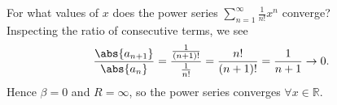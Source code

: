 \documentclass[../real_analysis.tex]{subfiles}
\begin{document}
        \begin{example}
            For what values of $x$ does the power series $\sum_{n=1}^\infty\frac{1}{n!}x^n$ converge?\\
            Inspecting the ratio of consecutive terms, we see
            \begin{equation*}
                \frac{\abs{a_{n+1}}}{\abs{a_n}}=\frac{\frac{1}{(n+1)!}}{\frac{1}{n!}}=\frac{n!}{(n+1)!}=\frac{1}{n+1}\to0.
            \end{equation*}
            Hence $\beta=0$ and $R=\infty$, so the power series converges $\forall x\in\mathbb{R}$.
        \end{example}
\end{document}
